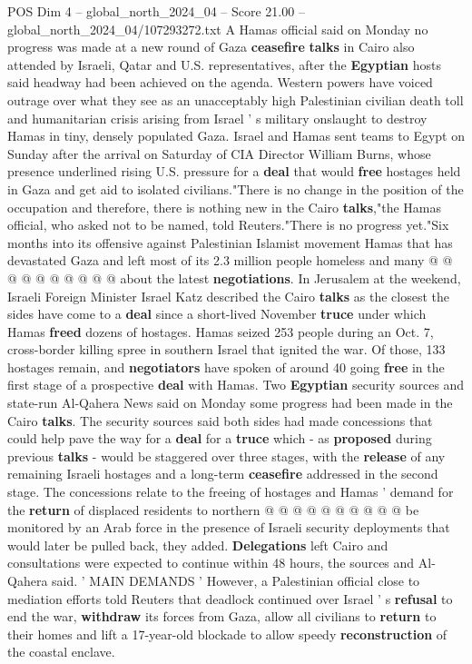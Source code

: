 \begin{textsample}{POS Dim 4 – global\_north\_2024\_04 – Score 21.00 – global\_north\_2024\_04/107293272.txt}  \label{ex:f4_pos_363}
A Hamas official said on Monday no progress was made at a new round of Gaza \textbf{ceasefire} \textbf{talks} in Cairo also attended by Israeli, Qatar and U.S. representatives, after the \textbf{Egyptian} hosts said headway had been achieved on the agenda.
Western powers have voiced outrage over what they see as an unacceptably high Palestinian civilian death toll and humanitarian crisis arising from Israel ' s military onslaught to destroy Hamas in tiny, densely populated Gaza.
Israel and Hamas sent teams to Egypt on Sunday after the arrival on Saturday of CIA Director William Burns, whose presence underlined rising U.S. pressure for a \textbf{deal} that would \textbf{free} hostages held in Gaza and get aid to isolated civilians."There is no change in the position of the occupation and therefore, there is nothing new in the Cairo \textbf{talks},"the Hamas official, who asked not to be named, told Reuters."There is no progress yet."Six months into its offensive against Palestinian Islamist movement Hamas that has devastated Gaza and left most of its 2.3 million people homeless and many @ @ @ @ @ @ @ @ @ @ about the latest \textbf{negotiations}.
In Jerusalem at the weekend, Israeli Foreign Minister Israel Katz described the Cairo \textbf{talks} as the closest the sides have come to a \textbf{deal} since a short-lived November \textbf{truce} under which Hamas \textbf{freed} dozens of hostages.
Hamas seized 253 people during an Oct. 7, cross-border killing spree in southern Israel that ignited the war.
Of those, 133 hostages remain, and \textbf{negotiators} have spoken of around 40 going \textbf{free} in the first stage of a prospective \textbf{deal} with Hamas.
Two \textbf{Egyptian} security sources and state-run Al-Qahera News said on Monday some progress had been made in the Cairo \textbf{talks}.
The security sources said both sides had made concessions that could help pave the way for a \textbf{deal} for a \textbf{truce} which - as \textbf{proposed} during previous \textbf{talks} - would be staggered over three stages, with the \textbf{release} of any remaining Israeli hostages and a long-term \textbf{ceasefire} addressed in the second stage.
The concessions relate to the freeing of hostages and Hamas ' demand for the \textbf{return} of displaced residents to northern @ @ @ @ @ @ @ @ @ @ be monitored by an Arab force in the presence of Israeli security deployments that would later be pulled back, they added. \textbf{Delegations} left Cairo and consultations were expected to continue within 48 hours, the sources and Al-Qahera said. ' MAIN DEMANDS ' However, a Palestinian official close to mediation efforts told Reuters that deadlock continued over Israel ' s \textbf{refusal} to end the war, \textbf{withdraw} its forces from Gaza, allow all civilians to \textbf{return} to their homes and lift a 17-year-old blockade to allow speedy \textbf{reconstruction} of the coastal enclave.

\end{textsample}
